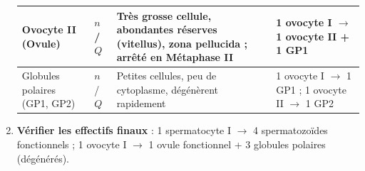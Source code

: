 \documentclass[11pt]{article}
\begin{document}
\begin{methode}
\begin{enumerate}
\begin{center}
\begin{tabularx}{\linewidth}{|l|X|X|X|}
Ovocyte II (Ovule) & $n$ / $Q$ & \textbf{Très grosse} cellule, abondantes réserves (vitellus), zona pellucida ; arrêté en \textbf{Métaphase II} & 1 ovocyte I $\to$ 1 ovocyte II + 1 GP1 \\ \hline
Globules polaires (GP1, GP2) & $n$ / $Q$ & Petites cellules, peu de cytoplasme, dégénèrent rapidement & 1 ovocyte I $\to$ 1 GP1 ; 1 ovocyte II $\to$ 1 GP2 \\ \hline
\end{tabularx}
\end{center}
\item \textbf{Vérifier les effectifs finaux} : 1 spermatocyte I $\to$ 4 spermatozoïdes fonctionnels ; 1 ovocyte I $\to$ 1 ovule fonctionnel + 3 globules polaires (dégénérés).
\end{enumerate}
\end{methode}
\end{document}
